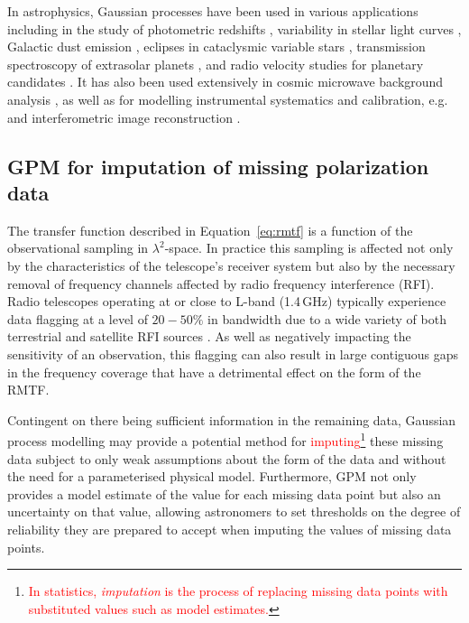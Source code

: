 \documentclass[fleqn,usenatbib]{mnras}
\begin{document}
In astrophysics, Gaussian processes have been used in various applications including in the study of photometric redshifts \citep{wa06300n}, variability in stellar light curves \citep{2018MNRAS.474.2094A}, Galactic dust emission \citep{ensslinfromert}, eclipses in cataclysmic variable stars \citep{10.1093/mnras/stw2417}, transmission spectroscopy of extrasolar planets \citep{2012MNRAS.419.2683G}, and radio velocity studies for planetary candidates \citep{10.1093/mnras/stv1428}. It has also been used extensively in cosmic microwave background analysis \citep{1987MNRAS.226..655B, PhysRevD.67.023001}, as well as for modelling instrumental systematics and calibration, e.g. \cite{2012MNRAS.419.2683G, 2014MNRAS.443.2517H, 2015ApJ...800...46B, Czekala_2015, 2015MNRAS.451..680E, 10.1093/mnras/stv1428, 2016MNRAS.459.2408A, 2016MNRAS.456L...6R, 2017MNRAS.466.4250L, mertens} and interferometric image reconstruction \citep{resolve}.

\subsection{GPM for imputation of missing polarization data}
\label{sec:imputation}

The transfer function described in Equation~\ref{eq:rmtf} is a function of the observational sampling in $\lambda^2$-space. In practice this sampling is affected not only by the characteristics of the telescope's receiver system but also by the necessary removal of frequency channels affected by radio frequency interference (RFI). Radio telescopes operating at or close to L-band (1.4\,GHz) typically experience data flagging at a level of $20-50\%$ in bandwidth due to a wide variety of both terrestrial and satellite RFI sources \citep[e.g.][]{deep2}. As well as negatively impacting the sensitivity of an observation, this flagging can also result in large contiguous gaps in the frequency coverage that have a detrimental effect on the form of the RMTF.

Contingent on there being sufficient information in the remaining data, Gaussian process modelling may provide a potential method for \textcolor{red}{imputing}\footnote{\textcolor{red}{In statistics, \emph{imputation} is the process of replacing missing data points with substituted values such as model estimates.}} these missing data subject to only weak assumptions about the form of the data and without the need for a parameterised physical model. Furthermore, GPM not only provides a model estimate of the value for each missing data point but also an uncertainty on that value, allowing astronomers to set thresholds on the degree of reliability they are prepared to accept when imputing the values of missing data points. 
\end{document}

